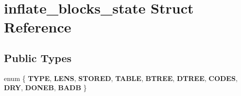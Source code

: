 \hypertarget{structinflate__blocks__state}{}\section{inflate\+\_\+blocks\+\_\+state Struct Reference}
\label{structinflate__blocks__state}
\subsection*{Public Types}
\begin{DoxyCompactItemize}
\item 
\mbox{\label{structinflate__blocks__state_a2df7b2deaaaecb40e23d72497c2a19b9}} 
enum \{ \newline
{\bfseries T\+Y\+PE}, 
{\bfseries L\+E\+NS}, 
{\bfseries S\+T\+O\+R\+ED}, 
{\bfseries T\+A\+B\+LE}, 
\newline
{\bfseries B\+T\+R\+EE}, 
{\bfseries D\+T\+R\+EE}, 
{\bfseries C\+O\+D\+ES}, 
{\bfseries D\+RY}, 
\newline
{\bfseries D\+O\+N\+EB}, 
{\bfseries B\+A\+DB}
 \}
\end{DoxyCompactItemize}
